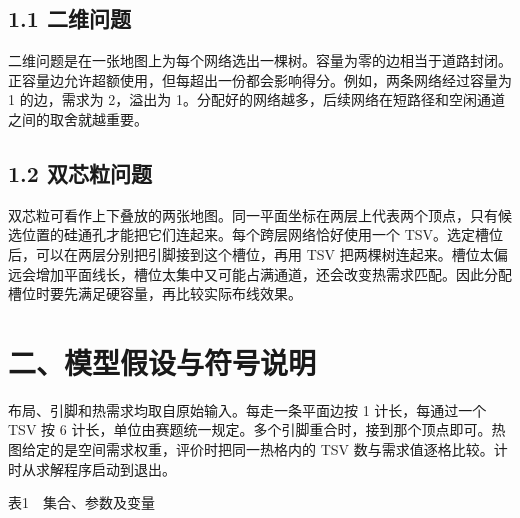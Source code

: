 \documentclass[12pt,a4paper]{article}
\begin{document}
\subsection{1.1 二维问题}\label{ux4e8cux7ef4ux95eeux9898}

二维问题是在一张地图上为每个网络选出一棵树。容量为零的边相当于道路封闭。正容量边允许超额使用，但每超出一份都会影响得分。例如，两条网络经过容量为
1 的边，需求为 2，溢出为
1。分配好的网络越多，后续网络在短路径和空闲通道之间的取舍就越重要。

\subsection{1.2 双芯粒问题}\label{ux53ccux82afux7c92ux95eeux9898}

双芯粒可看作上下叠放的两张地图。同一平面坐标在两层上代表两个顶点，只有候选位置的硅通孔才能把它们连起来。每个跨层网络恰好使用一个
TSV。选定槽位后，可以在两层分别把引脚接到这个槽位，再用 TSV
把两棵树连起来。槽位太偏远会增加平面线长，槽位太集中又可能占满通道，还会改变热需求匹配。因此分配槽位时要先满足硬容量，再比较实际布线效果。

\section{二、模型假设与符号说明}\label{ux4e8cux6a21ux578bux5047ux8bbeux4e0eux7b26ux53f7ux8bf4ux660e}

布局、引脚和热需求均取自原始输入。每走一条平面边按 1 计长，每通过一个
TSV 按 6
计长，单位由赛题统一规定。多个引脚重合时，接到那个顶点即可。热图给定的是空间需求权重，评价时把同一热格内的
TSV 数与需求值逐格比较。计时从求解程序启动到退出。

\begin{center}\fontsize{12}{14.4}\selectfont 表1　集合、参数及变量\end{center}
\end{document}
